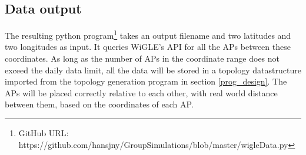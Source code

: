 \subsection{Data output}
The resulting python program\footnote{GitHub URL: https://github.com/hansjny/GroupSimulations/blob/master/wigleData.py} takes an output filename and two latitudes and two longitudes as input.
It queries WiGLE's API for all the APs between these coordinates. As long as the number of APs in the coordinate range does not exceed the daily data limit, all the data will be stored in a topology datastructure imported 
from the topology generation program in section \ref{prog_design}. The APs will be placed correctly relative to each other, with real world distance between them,
based on the coordinates of each AP. 


